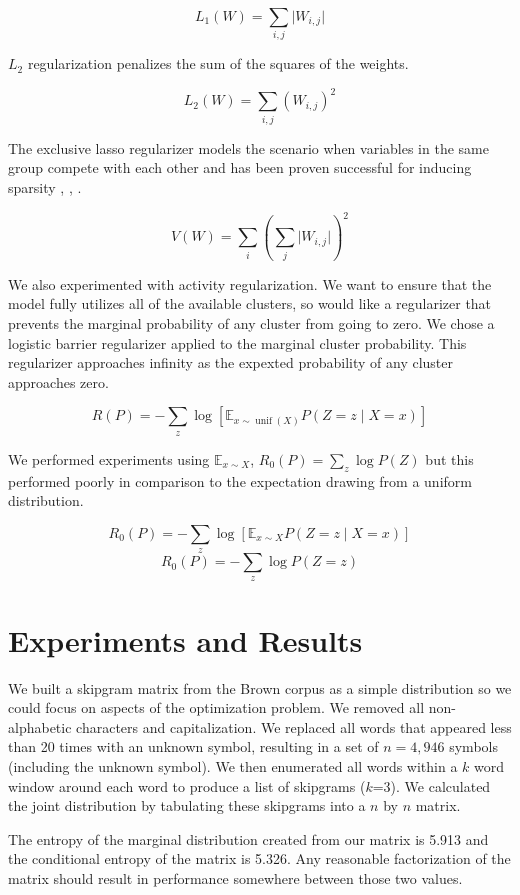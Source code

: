 \documentclass[11pt,letterpaper]{article}
\begin{document}
$$L_1(W) = \sum_{i,j} \lvert W_{i,j} \rvert $$

$L_2$ regularization penalizes the sum of the squares of the weights.

$$L_2(W) = \sum_{i,j} (W_{i,j})^2 $$

The exclusive lasso regularizer models the scenario when variables in the same group compete with each other and has been proven successful for inducing sparsity
\cite{zhou10a}, 
\cite{bach2012},
 \cite{Campbell15}.

$$V(W) = \sum_i (\sum_j \lvert W_{i,j} \rvert)^2$$ 

We also experimented with activity regularization. We want to ensure that the model fully utilizes all of the available clusters, so would like a regularizer that prevents the marginal probability of any cluster from going to zero. We chose a logistic barrier regularizer applied to the marginal cluster probability. This regularizer approaches infinity as the expexted probability of any cluster approaches zero.

$$ R(P) = -\sum_z \log[ \mathbb{E}_{x \sim \operatorname{unif}(X)} P(Z=z \mid X=x)]$$ 

We performed experiments using $\mathbb{E}_{x \sim X}$, $R_0(P)=\sum_z \log P(Z)$ but this performed poorly in comparison to the expectation drawing from a uniform distribution.

$$R_0(P) =  -\sum_z \log [ \mathbb{E}_{x \sim X} P(Z=z \mid X=x) ]$$ 
$$R_0(P) =  -\sum_z \log P(Z=z )$$ 

\section{Experiments and Results}

We built a skipgram matrix from the Brown corpus as a simple distribution so we could focus on aspects of the optimization problem. We removed all non-alphabetic characters and capitalization. We replaced all words that appeared less than 20 times with an unknown symbol, resulting in a set of $n=4,946$ symbols (including the unknown symbol). We then enumerated all words within a $k$ word window around each word to produce a list of skipgrams ($k$=3). We calculated the joint distribution by tabulating these skipgrams into a $n$ by $n$ matrix.

The entropy of the marginal distribution created from our matrix is 5.913 and the conditional entropy of the matrix is 5.326. Any reasonable factorization of the matrix should result in performance somewhere between those two values.
\end{document}
